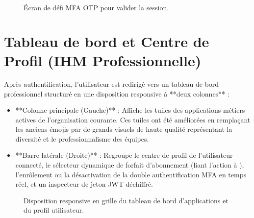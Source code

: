 \begin{figure}[h]
  \centering
  \caption{Écran de défi MFA OTP pour valider la session.}
  \label{fig:poc-login-mfa}
\end{figure}

\section{Tableau de bord et Centre de Profil (IHM Professionnelle)}
Après authentification, l'utilisateur est redirigé vers un tableau de bord professionnel structuré en une disposition responsive à **deux colonnes** :
\begin{itemize}
  \item **Colonne principale (Gauche)** : Affiche les tuiles des applications métiers actives de l'organisation courante. Ces tuiles ont été améliorées en remplaçant les anciens émojis par de grands visuels de haute qualité représentant la diversité et le professionnalisme des équipes.
  \item **Barre latérale (Droite)** : Regroupe le centre de profil de l'utilisateur connecté, le sélecteur dynamique de forfait d'abonnement (liant l'action à ), l'enrôlement ou la désactivation de la double authentification MFA en temps réel, et un inspecteur de jeton JWT déchiffré.
\end{itemize}

\begin{figure}[h]
  \centering
  \caption{Disposition responsive en grille du tableau de bord d'applications et du profil utilisateur.}
  \label{fig:poc-dashboard}
\end{figure}

